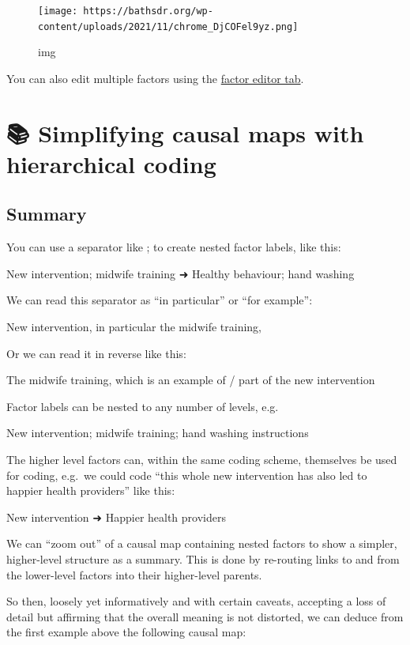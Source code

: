 \documentclass[
]{book}
\begin{document}
\begin{figure}
\centering
\texttt{[image: https://bathsdr.org/wp-content/uploads/2021/11/chrome\_DjCOFel9yz.png]}
\caption{img}
\end{figure}

You can also edit multiple factors using the \protect\hyperlink{xfactor-editor}{factor editor tab}.

\hypertarget{simplifying}{%
\chapter{📚 Simplifying causal maps with hierarchical coding}\label{simplifying}}

\hypertarget{summary-1}{%
\section{Summary}\label{summary-1}}

You can use a separator like ; to create nested factor labels, like this:

New intervention; midwife training ➜ Healthy behaviour; hand washing

We can read this separator as ``in particular'' or ``for example'':

New intervention, in particular the midwife training,

Or we can read it in reverse like this:

The midwife training, which is an example of / part of the new intervention

Factor labels can be nested to any number of levels, e.g.

New intervention; midwife training; hand washing instructions

The higher level factors can, within the same coding scheme, themselves be used for coding, e.g.~we could code ``this whole new intervention has also led to happier health providers'' like this:

New intervention ➜ Happier health providers

We can ``zoom out'' of a causal map containing nested factors to show a simpler, higher-level structure as a summary. This is done by re-routing links to and from the lower-level factors into their higher-level parents.

So then, loosely yet informatively and with certain caveats, accepting a loss of detail but affirming that the overall meaning is not distorted, we can deduce from the first example above the following causal map:
\end{document}

